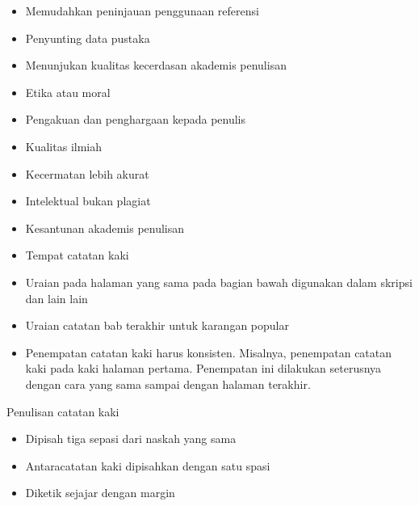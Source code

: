 \begin{itemize}
	\item Memudahkan peninjauan penggunaan referensi\par

	\item Penyunting data pustaka\par

	\item Menunjukan kualitas kecerdasan akademis penulisan\par

	\item Etika atau moral\par

	\item Pengakuan dan penghargaan kepada penulis\par

	\item Kualitas ilmiah\par

	\item Kecermatan lebih akurat\par

	\item Intelektual bukan plagiat\par

	\item Kesantunan akademis penulisan\par

	\item Tempat catatan kaki\par

	\item Uraian pada halaman yang sama pada bagian bawah digunakan dalam skripsi dan lain lain\par

	\item Uraian catatan bab terakhir untuk karangan popular\par

	\item Penempatan catatan kaki harus konsisten. Misalnya, penempatan catatan kaki pada kaki halaman pertama. Penempatan ini dilakukan seterusnya dengan cara yang sama sampai dengan halaman terakhir.
\end{itemize}\par


  Penulisan catatan kaki\par

\begin{itemize}
	\item Dipisah tiga sepasi dari naskah yang sama\par

	\item Antaracatatan kaki dipisahkan dengan satu spasi\par

	\item Diketik sejajar dengan margin
\end{itemize}\par


